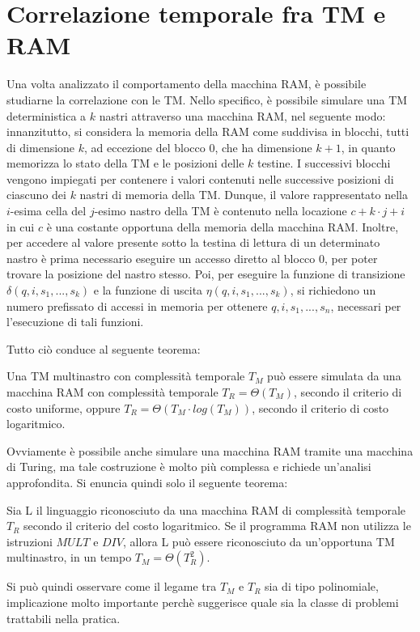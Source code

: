   \section{Correlazione temporale fra TM e RAM}
  Una volta analizzato il comportamento della macchina RAM, è possibile studiarne la correlazione con le TM. Nello specifico, è possibile simulare una TM deterministica a \(k\) nastri attraverso una macchina RAM, nel seguente modo: innanzitutto, si considera la memoria della RAM come suddivisa in blocchi, tutti di dimensione \(k\), ad eccezione del blocco 0, che ha dimensione \(k+1\), in quanto memorizza lo stato della TM e le posizioni delle \(k\) testine. I successivi blocchi vengono impiegati per contenere i valori contenuti nelle successive posizioni di ciascuno dei \(k\) nastri di memoria della TM. Dunque, il valore rappresentato nella \(i\)-esima cella del \(j\)-esimo nastro della TM è contenuto nella locazione \(c+k\cdot j+i\) in cui \(c\) è una costante opportuna della memoria della macchina RAM. 
  Inoltre, per accedere al valore presente sotto la testina di lettura di un determinato nastro è prima necessario eseguire un accesso diretto al blocco 0, per poter trovare la posizione del nastro stesso. Poi, per eseguire la funzione di transizione \(\delta(q,i,s_1,...,s_k)\) e la funzione di uscita \(\eta(q,i,s_1,...,s_k)\), si richiedono un numero prefissato di accessi in memoria per ottenere \(q,i,s_1,...,s_n\), necessari per l'esecuzione di tali funzioni.

  Tutto ciò conduce al seguente teorema:

  \begin{theorem}
    Una TM multinastro con complessità temporale \(T_M\) può essere simulata da una macchina RAM con complessità temporale \(T_R = \Theta( T_M)\), secondo il criterio di costo uniforme, oppure \(T_R = \Theta( T_M \cdot log( T_M))\), secondo il criterio di costo logaritmico. 
  \end{theorem}

  Ovviamente è possibile anche simulare una macchina RAM tramite una macchina di Turing, ma tale costruzione è molto più complessa e richiede un'analisi approfondita. Si enuncia quindi solo il seguente teorema:

  \begin{theorem}
    Sia L il linguaggio riconosciuto da una macchina RAM di complessità temporale \({T}_R\) secondo il criterio del costo logaritmico. Se il programma RAM non utilizza le istruzioni \(MULT\) e \(DIV\), allora L può essere riconosciuto da un'opportuna TM multinastro, in un tempo \({T}_M=\Theta({T}_R^2)\). 
  \end{theorem}

  Si può quindi osservare come il legame tra \({T}_M\) e \({T}_R\) sia di tipo polinomiale, implicazione molto importante perchè suggerisce quale sia la classe di problemi trattabili nella pratica.